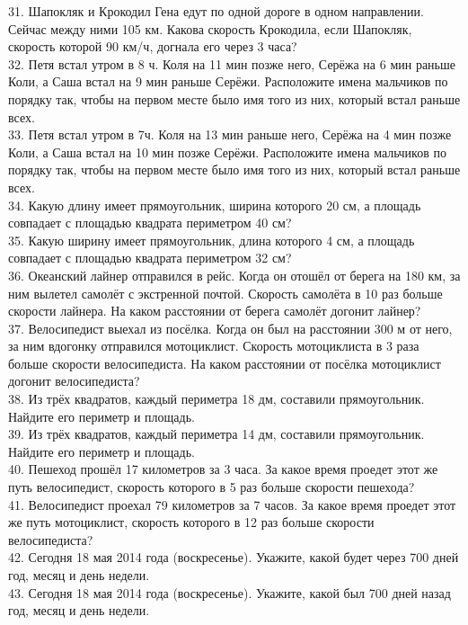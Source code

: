 \documentclass[12pt]{article}
\begin{document}
31. Шапокляк и Крокодил Гена едут по одной дороге в одном направлении. Сейчас между ними 105 км. Какова скорость Крокодила, если Шапокляк, скорость которой 90 км/ч, догнала его через 3 часа?\\
32. Петя встал утром в 8 ч. Коля на 11 мин позже него, Серёжа на 6 мин раньше Коли, а Саша встал на 9 мин раньше Серёжи. Расположите имена мальчиков по порядку так, чтобы на первом месте было имя того из них, который встал раньше всех.\\
33. Петя встал утром в 7ч. Коля на 13 мин раньше него, Серёжа на 4 мин позже Коли, а Саша встал на 10 мин позже Серёжи. Расположите имена мальчиков по порядку так, чтобы на первом месте было имя того из них, который встал раньше всех.\\
34. Какую длину имеет прямоугольник, ширина которого 20 см, а площадь совпадает с площадью квадрата периметром 40 см?\\
35. Какую ширину имеет прямоугольник, длина которого 4 см, а площадь совпадает с площадью квадрата периметром 32 см?\\
36. Океанский лайнер отправился в рейс. Когда он отошёл от берега на 180 км, за ним вылетел самолёт с экстренной почтой. Скорость самолёта в 10 раз больше скорости лайнера. На каком расстоянии от берега самолёт догонит лайнер?\\
37. Велосипедист выехал из посёлка. Когда он был на расстоянии 300 м от него, за ним вдогонку отправился мотоциклист. Скорость мотоциклиста в 3 раза больше скорости велосипедиста. На каком расстоянии от посёлка мотоциклист догонит велосипедиста?\\
38. Из трёх квадратов, каждый периметра 18 дм, составили прямоугольник. Найдите его периметр и площадь.\\
39. Из трёх квадратов, каждый периметра 14 дм, составили прямоугольник. Найдите его периметр и площадь.\\
40. Пешеход прошёл 17 километров за 3 часа. За какое время проедет этот же путь велосипедист, скорость которого в 5 раз больше скорости пешехода?\\
41. Велосипедист проехал 79 километров за 7 часов. За какое время проедет этот же путь мотоциклист, скорость которого в 12 раз больше скорости велосипедиста?\\
42. Сегодня 18 мая 2014 года (воскресенье). Укажите, какой будет через 700 дней год, месяц и день недели.\\
43. Сегодня 18 мая 2014 года (воскресенье). Укажите, какой был 700 дней назад год, месяц и день недели.\\
\end{document}
